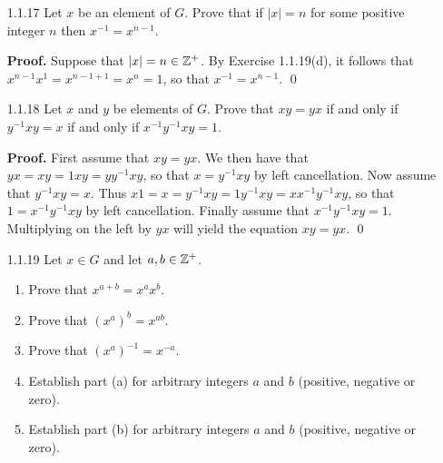 \begin{enumerate}
      \textbf{Proof.}
      
      $(\Leftarrow)$ Suppose that $x^2 = 1$. Then by definition,
      $|x| \le 2$. That is, $|x| = 1$ or $|x| = 2$.
      
      $(\Rightarrow)$ If $|x| = 1$, then $x = 1$, so that $x^2 = 1^2 = 1$; now
      if $|x| = 2$, then $x^2 = 1$. \qed
   \item[1.1.17]  Let $x$ be an element of $G$. Prove that if $|x| = n$ for some
                  positive integer $n$ then $x^{-1} = x^{n-1}$.
                  
      \textbf{Proof.} Suppose that $|x| = n \in \mathbb{Z}^+$. By Exercise 1.1.19(d), it
      follows that $x^{n-1}x^1 = x^{n-1+1} = x^n = 1$, so that
      $x^{-1} = x^{n-1}$. \qed
   \item[1.1.18]  Let $x$ and $y$ be elements of $G$. Prove that $xy = yx$ if
                  and only if $y^{-1}xy =x$ if and only if $x^{-1}y^{-1}xy = 1$.
                  
      \textbf{Proof.} First assume that $xy = yx$. We then have that
      $yx = xy = 1xy = yy^{-1}xy$, so that $x = y^{-1}xy$ by left cancellation.
      Now assume that $y^{-1}xy = x$. Thus
      $x1 = x = y^{-1}xy = 1y^{-1}xy = xx^{-1}y^{-1}xy$, so that
      $1 = x^{-1}y^{-1}xy$ by left cancellation. Finally assume that
      $x^{-1}y^{-1}xy = 1$. Multiplying on the left by $yx$ will yield the
      equation $xy = yx$. \qed
   \item[1.1.19]  Let $x \in G$ and let $a, b \in \mathbb{Z}^+$.
                  \begin{enumerate}
                     \item Prove that $x^{a+b} = x^ax^b$.
                     \item Prove that $(x^a)^b = x^{ab}$.
                     \item Prove that $(x^a)^{-1} = x^{-a}$.
                     \item Establish part (a) for arbitrary integers $a$ and $b$
                           (positive, negative or zero).
                     \item Establish part (b) for arbitrary integers $a$ and $b$
                           (positive, negative or zero).
                  \end{enumerate}
               

\end{enumerate}
